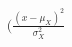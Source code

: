 \documentclass[preview]{standalone}
\begin{document}
\begin{align*}
\big( \frac{(x - \mu_X)^2}{\sigma_X^2}
\end{align*}
\end{document}

